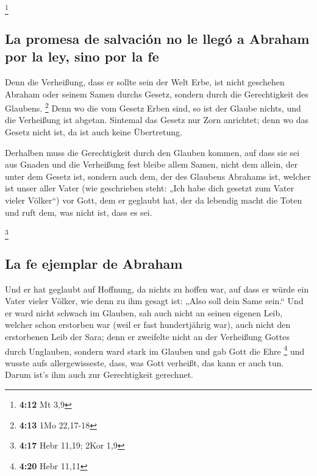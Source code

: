\footnote{\textbf{4:12} Mt 3,9}

\hypertarget{la-promesa-de-salvaciuxf3n-no-le-lleguxf3-a-abraham-por-la-ley-sino-por-la-fe}{%
\subsection{La promesa de salvación no le llegó a Abraham por la ley,
sino por la
fe}\label{la-promesa-de-salvaciuxf3n-no-le-lleguxf3-a-abraham-por-la-ley-sino-por-la-fe}}

 Denn die Verheißung, dass er sollte sein der Welt Erbe,
ist nicht geschehen Abraham oder seinem Samen durchs Gesetz, sondern
durch die Gerechtigkeit des Glaubens. \footnote{\textbf{4:13} 1Mo
  22,17-18}  Denn wo die vom Gesetz Erben sind, so ist
der Glaube nichts, und die Verheißung ist abgetan. 
Sintemal das Gesetz nur Zorn anrichtet; denn wo das Gesetz nicht ist, da
ist auch keine Übertretung.

 Derhalben muss die Gerechtigkeit durch den Glauben
kommen, auf dass sie sei aus Gnaden und die Verheißung fest bleibe allem
Samen, nicht dem allein, der unter dem Gesetz ist, sondern auch dem, der
des Glaubens Abrahams ist, welcher ist unser aller Vater 
(wie geschrieben steht: „Ich habe dich gesetzt zum Vater vieler
Völker``) vor Gott, dem er geglaubt hat, der da lebendig macht die Toten
und ruft dem, was nicht ist, dass es sei.

\footnote{\textbf{4:17} Hebr 11,19; 2Kor 1,9}

\hypertarget{la-fe-ejemplar-de-abraham}{%
\subsection{La fe ejemplar de Abraham}\label{la-fe-ejemplar-de-abraham}}

 Und er hat geglaubt auf Hoffnung, da nichts zu hoffen
war, auf dass er würde ein Vater vieler Völker, wie denn zu ihm gesagt
ist: „Also soll dein Same sein.``  Und er ward nicht
schwach im Glauben, sah auch nicht an seinen eigenen Leib, welcher schon
erstorben war (weil er fast hundertjährig war), auch nicht den
erstorbenen Leib der Sara;  denn er zweifelte nicht an
der Verheißung Gottes durch Unglauben, sondern ward stark im Glauben und
gab Gott die Ehre \footnote{\textbf{4:20} Hebr 11,11} 
und wusste aufs allergewisseste, dass, was Gott verheißt, das kann er
auch tun.  Darum ist's ihm auch zur Gerechtigkeit
gerechnet.

